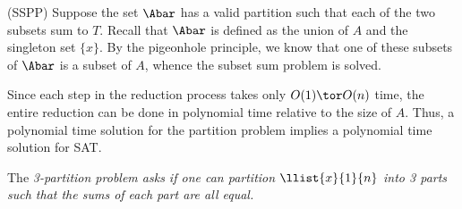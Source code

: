 \documentclass{article}
\begin{document}
\begin{solution}
\begin{subproof}[Correctness.]
  (SS\pmi PP)
  Suppose the set \( \Abar \) has a valid partition such that each of the two subsets sum to \( T \).
  Recall that \( \Abar \) is defined as the union of \( A \) and the singleton set \( \{x\} \).
  By the pigeonhole principle, we know that one of these subsets of \( \Abar \) is a subset of \( A \), whence the subset sum problem is solved.
\end{subproof}
Since each step in the reduction process takes only \( O(1)\tor O(n) \) time, the entire reduction can be done in polynomial time relative to the size of \( A \).
Thus, a polynomial time solution for the partition problem implies a polynomial time solution for SAT.
\end{solution}
\pagebreak


\begin{subexercise}\label{qs:3ptn}
  The \it{3-partition problem} asks if one can partition \( \llist{x}{1}{n} \) into 3 parts such that the sums of each part are all equal.
\end{subexercise}
\end{document}
